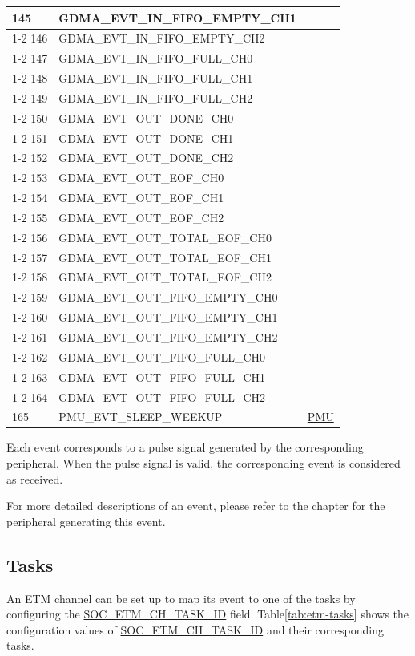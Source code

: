 \documentclass[main\_\_EN.tex]{subfiles}
\begin{document}
\begin{longtable}{ | l | l | l | }
145 & GDMA\_EVT\_IN\_FIFO\_EMPTY\_CH1  & \\ \cline{1-2}
146 & GDMA\_EVT\_IN\_FIFO\_EMPTY\_CH2  & \\ \cline{1-2}
147 & GDMA\_EVT\_IN\_FIFO\_FULL\_CH0   & \\ \cline{1-2}
148 & GDMA\_EVT\_IN\_FIFO\_FULL\_CH1   & \\ \cline{1-2}
149 & GDMA\_EVT\_IN\_FIFO\_FULL\_CH2   & \\ \cline{1-2}
150 & GDMA\_EVT\_OUT\_DONE\_CH0 & \\ \cline{1-2}
151 & GDMA\_EVT\_OUT\_DONE\_CH1 & \\ \cline{1-2}
152 & GDMA\_EVT\_OUT\_DONE\_CH2 & \\ \cline{1-2}
153 & GDMA\_EVT\_OUT\_EOF\_CH0  & \\ \cline{1-2}
154 & GDMA\_EVT\_OUT\_EOF\_CH1  & \\ \cline{1-2}
155 & GDMA\_EVT\_OUT\_EOF\_CH2  & \\ \cline{1-2}
156 & GDMA\_EVT\_OUT\_TOTAL\_EOF\_CH0  & \\ \cline{1-2}
157 & GDMA\_EVT\_OUT\_TOTAL\_EOF\_CH1  & \\ \cline{1-2}
158 & GDMA\_EVT\_OUT\_TOTAL\_EOF\_CH2  & \\ \cline{1-2}
159 & GDMA\_EVT\_OUT\_FIFO\_EMPTY\_CH0 & \\ \cline{1-2}
160 & GDMA\_EVT\_OUT\_FIFO\_EMPTY\_CH1 & \\ \cline{1-2}
161 & GDMA\_EVT\_OUT\_FIFO\_EMPTY\_CH2 & \\ \cline{1-2}
162 & GDMA\_EVT\_OUT\_FIFO\_FULL\_CH0  & \\ \cline{1-2}
163 & GDMA\_EVT\_OUT\_FIFO\_FULL\_CH1  & \\ \cline{1-2}
164 & GDMA\_EVT\_OUT\_FIFO\_FULL\_CH2  & \\ \hline
165 & PMU\_EVT\_SLEEP\_WEEKUP   & \hyperref[mod:lowpowm]{PMU} \\ \hline
\end{longtable}

Each event corresponds to a pulse signal generated by the corresponding peripheral. When the pulse signal is valid, the corresponding event is considered as received.

For more detailed descriptions of an event, please refer to the chapter for the peripheral generating this event.


\subsection{Tasks}
\label{sec:evntaskmatrix-tasks}
An ETM channel can be set up to map its event to one of the tasks by configuring the  \hyperref[fielddesc:SOCETMCH0TASKID]{SOC\_ETM\_CH\_TASK\_ID} field. Table\ref{tab:etm-tasks}  shows the configuration values of \hyperref[fielddesc:SOCETMCH0TASKID]{SOC\_ETM\_CH\_TASK\_ID} and their corresponding tasks.
\end{document}
